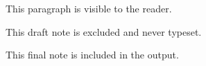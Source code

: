 \documentclass{article}
\begin{document}
This paragraph is visible to the reader.
\begin{draftnote}
This draft note is excluded and never typeset.
\end{draftnote}
\begin{finalnote}
This final note is included in the output.
\end{finalnote}
\end{document}
